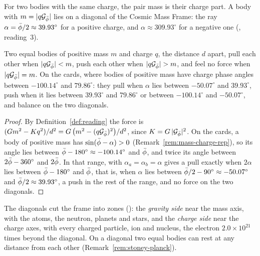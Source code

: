 For two bodies with the same charge, the pair mass is their charge part. A body with $m = |q\mathcal{G}_{\bar{\phi}}|$ lies on a diagonal of the Cosmic Mass Frame: the ray $\alpha = \bar{\phi}/2 \approx 39.93^\circ$ for a positive charge, and $\alpha \approx 309.93^\circ$ for a negative one (, reading~3).

\begin{proposition}\label{prop:op-zones}
Two equal bodies of positive mass $m$ and charge $q$, the distance $d$ apart, pull each other when $|q\mathcal{G}_{\bar{\phi}}| < m$, push each other when $|q\mathcal{G}_{\bar{\phi}}| > m$, and feel no force when $|q\mathcal{G}_{\bar{\phi}}| = m$. On the cards, where bodies of positive mass have charge phase angles between $-100.14^\circ$ and $79.86^\circ$: they pull when $\alpha$ lies between $-50.07^\circ$ and $39.93^\circ$, push when it lies between $39.93^\circ$ and $79.86^\circ$ or between $-100.14^\circ$ and $-50.07^\circ$, and balance on the two diagonals.
\end{proposition}

\begin{proof}
By Definition~\ref{def:reading} the force is $(G m^2 - K q^2)/d^2 = G\,\bigl(m^2 - (q\mathcal{G}_{\bar{\phi}})^2\bigr)/d^2$, since $K = G\,|\mathcal{G}_{\bar{\phi}}|^2$. On the cards, a body of positive mass has $\sin(\bar{\phi} - \alpha) > 0$ (Remark~\ref{rem:mass-charge-rep}), so its angle lies between $\bar{\phi} - 180^\circ \approx -100.14^\circ$ and $\bar{\phi}$, and twice its angle between $2\bar{\phi} - 360^\circ$ and $2\bar{\phi}$. In that range,  with $\alpha_a = \alpha_b = \alpha$ gives a pull exactly when $2\alpha$ lies between $\bar{\phi} - 180^\circ$ and $\bar{\phi}$, that is, when $\alpha$ lies between $\bar{\phi}/2 - 90^\circ \approx -50.07^\circ$ and $\bar{\phi}/2 \approx 39.93^\circ$, a push in the rest of the range, and no force on the two diagonals.
\end{proof}

The diagonals cut the frame into zones (): the \emph{gravity side} near the mass axis, with the atoms, the neutron, planets and stars, and the \emph{charge side} near the charge axes, with every charged particle, ion and nucleus, the electron $2.0 \times 10^{21}$ times beyond the diagonal. On a diagonal two equal bodies can rest at any distance from each other (Remark~\ref{rem:stoney-planck}).

